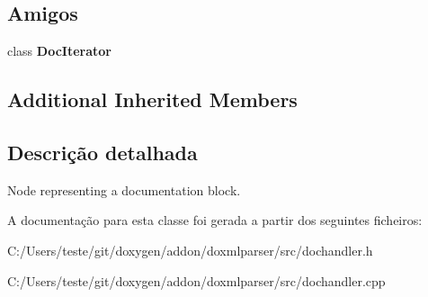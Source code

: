 \subsection*{Amigos}
\begin{DoxyCompactItemize}
\item 
\hypertarget{class_doc_handler_a531bd66459994eb17758adefa70d27dd}{class {\bfseries Doc\-Iterator}}\label{class_doc_handler_a531bd66459994eb17758adefa70d27dd}

\end{DoxyCompactItemize}
\subsection*{Additional Inherited Members}


\subsection{Descrição detalhada}
Node representing a documentation block. 



A documentação para esta classe foi gerada a partir dos seguintes ficheiros\-:\begin{DoxyCompactItemize}
\item 
C\-:/\-Users/teste/git/doxygen/addon/doxmlparser/src/dochandler.\-h\item 
C\-:/\-Users/teste/git/doxygen/addon/doxmlparser/src/dochandler.\-cpp\end{DoxyCompactItemize}
